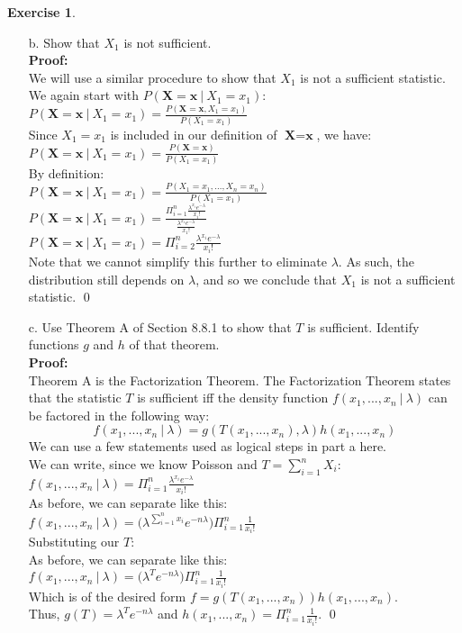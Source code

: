 \documentclass[11pt]{article}
\theoremstyle{definition}
\newtheorem{exercise}[theorem]{Exercise}
\newcommand{\st}{\ |\ }
\newcommand{\V}{\vspace{0.3cm}\\}
\newcommand{\pro}{\V \textbf{Proof:} \V}
\begin{document}
\begin{exercise}
\begin{enumerate}
\item[b.] Show that $X_1$ is not sufficient. \pro
We will use a similar procedure to show that $X_1$ is not a sufficient statistic. \V
We again start with $P(\textbf{X} = \textbf{x} \st X_1 = x_1)$:\V
$P(\textbf{X} = \textbf{x} \st X_1 = x_1) = \frac{P(\textbf{X} = \textbf{x}, X_1 = x_1)}{P(X_1 = x_1)}$\V
Since $X_1 = x_1$ is included in our definition of $\textbf{X} = \textbf{x}$, we have:\V
$P(\textbf{X} = \textbf{x} \st X_1 = x_1) = \frac{P(\textbf{X} = \textbf{x})}{P(X_1 = x_1)}$\V
By definition: \V
$P(\textbf{X} = \textbf{x} \st X_1 = x_1) = \frac{P(X_1 = x_1,...,X_n=x_n)}{P(X_1 = x_1)}$\V
$P(\textbf{X} = \textbf{x} \st X_1 = x_1) = \displaystyle \frac{\displaystyle \Pi_{i=1}^n \displaystyle \frac{\lambda^{x_i} e^{-\lambda}}{x_i!} }{\displaystyle \frac{\lambda^{x_1} e^{-\lambda}}{x_1!}}$ \V
$P(\textbf{X} = \textbf{x} \st X_1 = x_1) = \displaystyle \Pi_{i=2}^n \displaystyle \frac{\lambda^{x_i} e^{-\lambda}}{x_i!} $ \V
Note that we cannot simplify this further to eliminate $\lambda$. As such, the distribution still depends on $\lambda$, and so we conclude that $X_1$ is not a sufficient statistic. \qed \newpage
\item[c.] Use Theorem A of Section 8.8.1 to show that $T$ is sufficient. Identify functions $g$ and $h$ of that theorem. \pro
Theorem A is the Factorization Theorem. The Factorization Theorem states that the statistic $T$ is sufficient iff the density function $f(x_1, ..., x_n \st \lambda)$ can be factored in the following way: $$f(x_1,...,x_n \st \lambda) = g(T(x_1,...,x_n), \lambda) h(x_1,...,x_n) $$
We can use a few statements used as logical steps in part a here. \V
We can write, since we know Poisson and $T = \sum_{i=1}^n X_i$:\V
$f(x_1,...,x_n \st \lambda) = \Pi_{i=1}^n \frac{\lambda^{x_i} e^{-\lambda}}{x_i!}$ \V
As before, we can separate like this: \V
$f(x_1,...,x_n \st \lambda) = \bigg(\lambda^{\sum_{i=1}^n x_i} e^{-n\lambda} \bigg) \Pi_{i=1}^n \frac{1}{x_i!}$ \V
Substituting our $T$:\V
As before, we can separate like this: \V
$f(x_1,...,x_n \st \lambda) = \bigg(\lambda^{T} e^{-n\lambda} \bigg) \Pi_{i=1}^n \frac{1}{x_i!}$ \V
Which is of the desired form $f = g(T(x_1,...,x_n))h(x_1,...,x_n)$. \V
Thus, $g(T) = \lambda^T e^{-n\lambda}$ and $h(x_1,...,x_n) = \displaystyle \Pi_{i=1}^n \frac{1}{x_i!}$. \qed
\end{enumerate}

\end{exercise}
\end{document}
